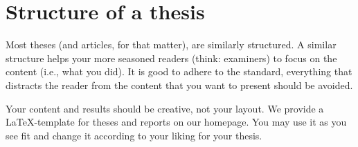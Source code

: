 \documentclass[twocolumn]{mlai-guide}
\begin{document}
\section{Structure of a thesis} \label{sec:structure}

Most theses (and articles, for that matter), are similarly structured. 
A similar structure helps your more seasoned readers (think: examiners) to focus on the content (i.e., what you did). 
It is good to adhere to the standard, everything that distracts the reader from the content that you want to present should be avoided.

Your content and results should be creative, not your layout.
We provide a \LaTeX-template for theses and reports on our homepage.
You may use it as you see fit and change it according to your liking for your thesis.
\end{document}
